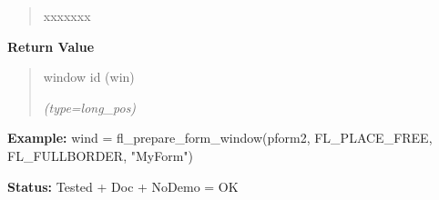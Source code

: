 \begin{boxedminipage}{\funcwidth}
\begin{quote}
\begin{Ventry}{xxxxxxx}
        \end{Ventry}

      \end{quote}

      \textbf{Return Value}
    \vspace{-1ex}

      \begin{quote}
      window id (win)

      {\it (type=long\_pos)}

      \end{quote}

\textbf{Example:} wind = fl\_prepare\_form\_window(pform2, FL\_PLACE\_FREE, FL\_FULLBORDER, 
"MyForm")



\textbf{Status:} Tested + Doc + NoDemo = OK



    \end{boxedminipage}

    \label{xformslib:flbasic:fl_show_form_window}

    \vspace{0.5ex}

